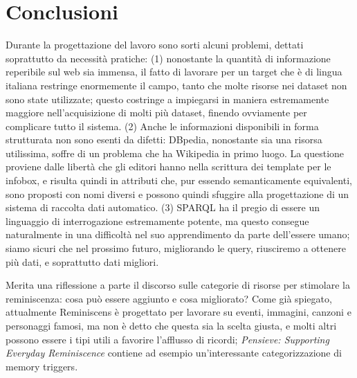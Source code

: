 \documentclass[sigproc-sp.tex]{subfiles}
\begin{document}
\section{Conclusioni}
Durante la progettazione del lavoro sono sorti alcuni problemi, dettati soprattutto da necessità pratiche: (1) nonostante la quantità di informazione reperibile sul web sia immensa, il fatto di lavorare per un target che è di lingua italiana restringe enormemente il campo, tanto che molte risorse nei dataset non sono state utilizzate; questo costringe a impiegarsi in maniera estremamente maggiore nell’acquisizione di molti più dataset, finendo ovviamente per complicare tutto il sistema. (2) Anche le informazioni disponibili in forma strutturata non sono esenti da difetti: DBpedia, nonostante sia una risorsa utilissima, soffre di un problema che ha Wikipedia in primo luogo. La questione proviene dalle libertà che gli editori hanno nella scrittura dei template per le infobox, e risulta quindi in attributi che, pur essendo semanticamente equivalenti, sono proposti con nomi diversi e possono quindi sfuggire alla progettazione di un sistema di raccolta dati automatico. (3) SPARQL ha il pregio di essere un linguaggio di interrogazione estremamente potente, ma questo consegue naturalmente in una difficoltà nel suo apprendimento da parte dell'essere umano; siamo sicuri che nel prossimo futuro, migliorando le query, riusciremo a ottenere più dati, e soprattutto dati migliori.

Merita una riflessione a parte il discorso sulle categorie di risorse per stimolare la reminiscenza: cosa può essere aggiunto e cosa migliorato? Come già spiegato, attualmente Reminiscens è progettato per lavorare su eventi, immagini, canzoni e personaggi famosi, ma non è detto che questa sia la scelta giusta, e molti altri possono essere i tipi utili a favorire l'afflusso di ricordi; \textit{Pensieve: Supporting Everyday Reminiscence} contiene ad esempio un'interessante categorizzazione di memory triggers\cite{peesapati2010pensieve}.
\end{document}
